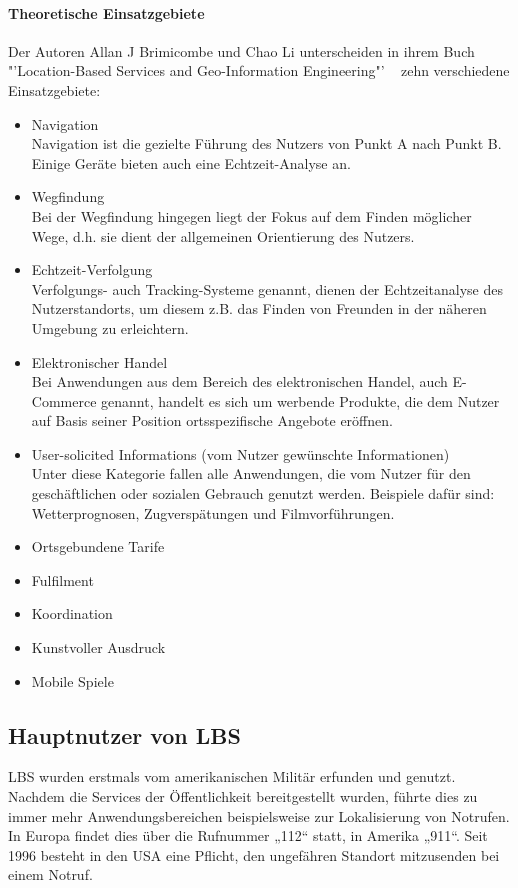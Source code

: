\paragraph{Theoretische Einsatzgebiete}
Der Autoren Allan J Brimicombe und Chao Li unterscheiden in ihrem Buch "'Location-Based Services and Geo-Information Engineering"' ~\cite[S.132]{brimicombe_li:application_area} zehn verschiedene Einsatzgebiete:
\begin{itemize}
	\item Navigation\\
Navigation ist die gezielte Führung des Nutzers von Punkt A nach Punkt B. Einige Geräte bieten auch eine Echtzeit-Analyse an.
	\item Wegfindung\\
Bei der Wegfindung hingegen liegt der Fokus auf dem Finden möglicher Wege, d.h. sie dient der allgemeinen Orientierung des Nutzers.
	\item Echtzeit-Verfolgung\\
Verfolgungs- auch Tracking-Systeme genannt, dienen der Echtzeitanalyse des Nutzerstandorts, um diesem z.B. das Finden von Freunden in der näheren Umgebung zu erleichtern.
	\item Elektronischer Handel\\
Bei Anwendungen aus dem Bereich des elektronischen Handel, auch E-Commerce genannt, handelt es sich um werbende Produkte, die dem Nutzer auf Basis seiner Position ortsspezifische Angebote eröffnen.
	\item User-solicited Informations (vom Nutzer gewünschte Informationen)\\
Unter diese Kategorie fallen alle Anwendungen, die vom Nutzer für den geschäftlichen oder sozialen Gebrauch genutzt werden. Beispiele dafür sind: Wetterprognosen, Zugverspätungen und Filmvorführungen.
	\item Ortsgebundene Tarife
	\item Fulfilment
	\item Koordination
	\item Kunstvoller Ausdruck
	\item Mobile Spiele
\end{itemize}


\subsection{Hauptnutzer von LBS}

LBS wurden erstmals vom amerikanischen Militär erfunden und genutzt. Nachdem die Services der Öffentlichkeit bereitgestellt wurden, führte dies zu immer mehr Anwendungsbereichen beispielsweise zur Lokalisierung von Notrufen. In Europa findet dies über die Rufnummer „112“ statt, in Amerika „911“.  Seit 1996 besteht in den USA eine Pflicht, den ungefähren Standort mitzusenden bei einem Notruf. 

